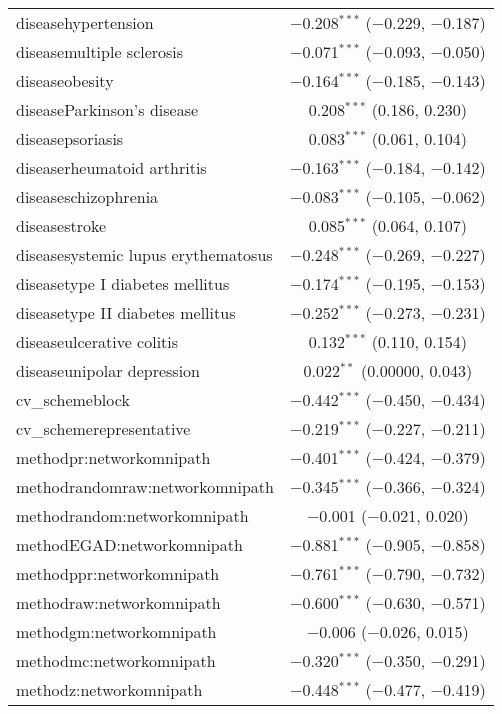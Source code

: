 \begin{table}[!htbp]
\begin{tabular}{@{\extracolsep{5pt}}lc}
  diseasehypertension & $-$0.208$^{***}$ ($-$0.229, $-$0.187) \\ 
  diseasemultiple sclerosis & $-$0.071$^{***}$ ($-$0.093, $-$0.050) \\ 
  diseaseobesity & $-$0.164$^{***}$ ($-$0.185, $-$0.143) \\ 
  diseaseParkinson's disease & 0.208$^{***}$ (0.186, 0.230) \\ 
  diseasepsoriasis & 0.083$^{***}$ (0.061, 0.104) \\ 
  diseaserheumatoid arthritis & $-$0.163$^{***}$ ($-$0.184, $-$0.142) \\ 
  diseaseschizophrenia & $-$0.083$^{***}$ ($-$0.105, $-$0.062) \\ 
  diseasestroke & 0.085$^{***}$ (0.064, 0.107) \\ 
  diseasesystemic lupus erythematosus & $-$0.248$^{***}$ ($-$0.269, $-$0.227) \\ 
  diseasetype I diabetes mellitus & $-$0.174$^{***}$ ($-$0.195, $-$0.153) \\ 
  diseasetype II diabetes mellitus & $-$0.252$^{***}$ ($-$0.273, $-$0.231) \\ 
  diseaseulcerative colitis & 0.132$^{***}$ (0.110, 0.154) \\ 
  diseaseunipolar depression & 0.022$^{**}$ (0.00000, 0.043) \\ 
  cv\_schemeblock & $-$0.442$^{***}$ ($-$0.450, $-$0.434) \\ 
  cv\_schemerepresentative & $-$0.219$^{***}$ ($-$0.227, $-$0.211) \\ 
  methodpr:networkomnipath & $-$0.401$^{***}$ ($-$0.424, $-$0.379) \\ 
  methodrandomraw:networkomnipath & $-$0.345$^{***}$ ($-$0.366, $-$0.324) \\ 
  methodrandom:networkomnipath & $-$0.001 ($-$0.021, 0.020) \\ 
  methodEGAD:networkomnipath & $-$0.881$^{***}$ ($-$0.905, $-$0.858) \\ 
  methodppr:networkomnipath & $-$0.761$^{***}$ ($-$0.790, $-$0.732) \\ 
  methodraw:networkomnipath & $-$0.600$^{***}$ ($-$0.630, $-$0.571) \\ 
  methodgm:networkomnipath & $-$0.006 ($-$0.026, 0.015) \\ 
  methodmc:networkomnipath & $-$0.320$^{***}$ ($-$0.350, $-$0.291) \\ 
  methodz:networkomnipath & $-$0.448$^{***}$ ($-$0.477, $-$0.419) \\ 

\end{tabular}
\end{table}
